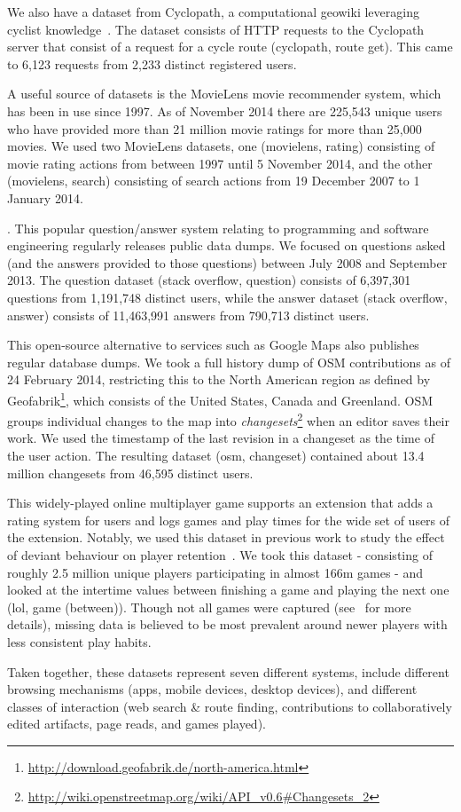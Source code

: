  We also have a dataset from Cyclopath, a computational geowiki leveraging cyclist knowledge~\cite{priedhorsky2008computational}.  The dataset consists of HTTP requests to the Cyclopath server that consist of a request for a cycle route (cyclopath, route get). This came to 6,123 requests from 2,233 distinct registered users.

 A useful source of datasets is the MovieLens movie recommender system, which has been in use since 1997. As of November 2014 there are 225,543 unique users who have provided more than 21 million movie ratings for more than 25,000 movies. We used two MovieLens datasets, one (movielens, rating) consisting of movie rating actions from between 1997 until 5 November 2014, and the other (movielens, search) consisting of search actions from 19 December 2007 to 1 January 2014.

. This popular question/answer system relating to programming and software engineering regularly releases public data dumps. We focused on questions asked (and the answers provided to those questions) between July 2008 and September 2013. The question dataset (stack overflow, question) consists of 6,397,301 questions from 1,191,748 distinct users, while the answer dataset (stack overflow, answer) consists of 11,463,991 answers from 790,713 distinct users.

 This open-source alternative to services such as Google Maps also publishes regular database dumps. We took a full history dump of OSM contributions as of 24 February 2014, restricting this to the North American region as defined by Geofabrik\footnote{\url{http://download.geofabrik.de/north-america.html}}, which consists of the United States, Canada and Greenland. OSM groups individual changes to the map into \textit{changesets}\footnote{\url{http://wiki.openstreetmap.org/wiki/API_v0.6#Changesets_2}} when an editor saves their work. We used the timestamp of the last revision in a changeset as the time of the user action. The resulting dataset (osm, changeset) contained about 13.4 million changesets from 46,595 distinct users.

 This widely-played online multiplayer game supports an extension that adds a rating system for users and logs games and play times for the wide set of users of the extension.  Notably, we used this dataset in previous work to study the effect of deviant behaviour on player retention~\cite{shores2014identification}. We took this dataset - consisting of roughly 2.5 million unique players participating in almost 166m games - and looked at the intertime values between finishing a game and playing the next one (lol, game (between)). Though not all games were captured (see~\cite{shores2014identification} for more details), missing data is believed to be most prevalent around newer players with less consistent play habits.

Taken together, these datasets represent seven different systems, include different browsing mechanisms (apps, mobile devices, desktop devices), and different classes of interaction (web search \& route finding, contributions to collaboratively edited artifacts, page reads, and games played).
